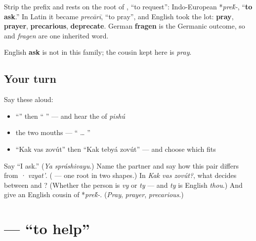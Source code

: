\begin{cousinweb}
Strip the prefix and \textbf{} rests on the root of \textbf{}, \textquotedblleft{}to request\textquotedblright{}: Indo-European *\emph{pre\'{k}-}, \textquotedblleft{}\textbf{to ask}.\textquotedblright{} In Latin it became \emph{precārī}, \textquotedblleft{}to pray\textquotedblright{}, and English took the lot: \textbf{pray}, \textbf{prayer}, \textbf{precarious}, \textbf{deprecate}. German \textbf{fragen} is the Germanic outcome, so \emph{} and \emph{fragen} are one inherited word.

English \textbf{ask} is not in this family; the cousin kept here is \emph{pray}.
\end{cousinweb}

\subsection*{Your turn}
Say these aloud:

\begin{itemize}
\raggedright
  \item \textquotedblleft{}\textquotedblright{} then \textquotedblleft{} \textquotedblright{} — and hear the \emph{} of \emph{pishú}
  \item the two mouths — \textquotedblleft{}  …  \textquotedblright{}
  \item \textquotedblleft{}Kak vas zovút\textquotedblright{} then \textquotedblleft{}Kak tebyá zovút\textquotedblright{} — and choose which fits
\end{itemize}

\begin{tcolorbox}[breakable,colback=teal!4,colframe=teal!35!black,title={Before you move on}]
Say \textquotedblleft{}I ask.\textquotedblright{} (\emph{Ya spráshivayu}.) Name the partner and say how this pair differs from \emph{ · vzyat'}. (\textbf{} — one root in two shapes.) In \emph{Kak vas zovút?}, what decides between \textbf{} and \textbf{}? (Whether the person is \emph{vy} or \emph{ty} — and \emph{ty} is English \emph{thou}.) And give an English cousin of *\emph{pre\'{k}-}. (\emph{Pray}, \emph{prayer}, \emph{precarious}.)
\end{tcolorbox}
\section[\texorpdfstring{\ru{помогать} (pomogát')}{помогать (pomogát')}]{ — \textquotedblleft{}to help\textquotedblright{}}


